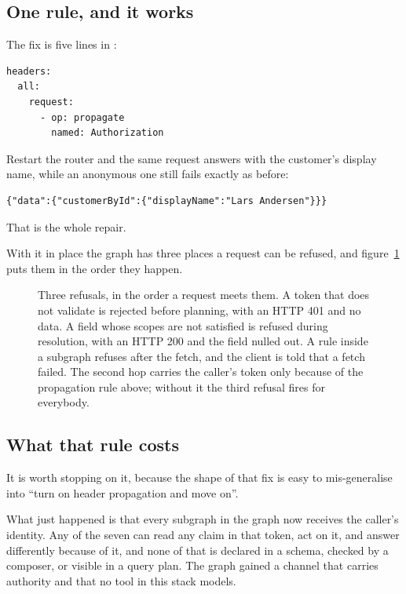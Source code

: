 \subsection*{One rule, and it works}

%
The fix is five lines in :

\begin{verbatim}
headers:
  all:
    request:
      - op: propagate
        named: Authorization
\end{verbatim}

Restart the router and the same request answers with the customer's display
name, while an anonymous one still fails exactly as before:

\begin{verbatim}
{"data":{"customerById":{"displayName":"Lars Andersen"}}}
\end{verbatim}

That is the whole repair.

With it in place the graph has three places a request can be refused, and
figure~\ref{fig:ch15-where-a-refusal-happens} puts them in the order they
happen.

\begin{figure}[htbp]
  \centering
  
  \caption{Three refusals, in the order a request meets them. A token that does
  not validate is rejected before planning, with an HTTP 401 and no data. A
  field whose scopes are not satisfied is refused during resolution, with an
  HTTP 200 and the field nulled out. A rule inside a subgraph refuses after the
  fetch, and the client is told that a fetch failed. The second hop carries the
  caller's token only because of the propagation rule above; without it the
  third refusal fires for everybody.}
  \label{fig:ch15-where-a-refusal-happens}
\end{figure}

\subsection*{What that rule costs}

%
It is worth stopping on it, because the shape of that fix is easy to
mis-generalise into \enquote{turn on header propagation and move on}.

What just happened is that every subgraph in the graph now receives the
caller's identity. Any of the seven can read any claim in that token, act on
it, and answer differently because of it, and none of that is declared in a
schema, checked by a composer, or visible in a query plan. The graph gained a
channel that carries authority and that no tool in this stack models.

